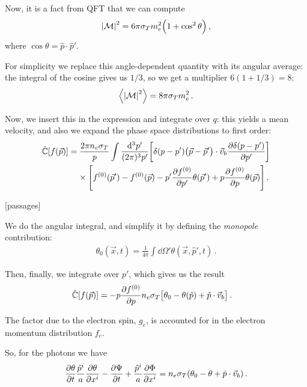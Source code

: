 \documentclass[main.tex]{subfiles}
\begin{document}
Now, it is a fact from QFT that we can compute 
%
\begin{align}
\abs{\mathcal{M}}^2 = 6 \pi \sigma_{T} m_e^2 \qty(1 + \cos^2\theta )
\,,
\end{align}
%
where \(\cos \theta = \hat{p} \cdot \hat{p}'\). 

For simplicity we replace this angle-dependent quantity with its angular average: the integral of the cosine gives us \(1/3\), so we get a multiplier \(6 ( 1+ 1/3) = 8 \): 
%
\begin{align}
\expval{ \abs{\mathcal{M}}^2} = 8 \pi \sigma_{T} m_e^2
\,.
\end{align}

Now, we insert this in the expression and integrate over \(q\): this yields a mean velocity, and also we expand the phase space distributions to first order:
%
\begin{align}
\begin{split}
\hat{\mathbb{C}} [f(\vec{p})] &= 
\frac{2 \pi n_e \sigma_{T}}{p}
\int \frac{ \dd[3]{p'}}{(2\pi)^3 p'} 
\qty[ \delta (p - p') \qty(\vec{p} - \vec{p}') \cdot \vec{v}_b \pdv{ \delta (p - p')}{p'}] \\
&\phantom{=}\ 
\times \qty[ f^{(0)} (\vec{p}') - f^{(0)}(\vec{p}) - p' \pdv{f^{(0)}}{p'} \theta (\vec{p}') + p \pdv{f^{(0)}}{p} \theta (\vec{p})]
\,.
\end{split}
\end{align}
%

[passages]

We do the angular integral, and simplify it by defining the \emph{monopole} contribution:
%
\begin{align}
\theta_0 (\vec{x}, t) =  \frac{1}{4 \pi } \int \dd{\Omega'} 
\theta (\vec{x}, \hat{p}', t)
\,.
\end{align}

Then, finally, we integrate over \(p'\), which gives us the result 
%
\begin{align}
\hat{\mathbb{C}} [f(\vec{p})] &=
- p \pdv{f^{(0)}}{p} n_e \sigma_T 
\qty[\theta_0 - \theta (\hat{p}) + \hat{p} \cdot \vec{v}_b]
\,.
\end{align}

The factor due to the electron spin, \(g_e\), is accounted for in the  electron momentum distribution \(f_e\). 

So, for the photons we have 
%
\begin{align}
\pdv{\theta }{t} \frac{\hat{p}^{i}}{a} \pdv{\theta }{x^{i}}
- \pdv{\Psi }{t} + \frac{\hat{p}^{i}}{a} \pdv{\Phi }{x^{i}} 
= n_e \sigma_{T} \qty(\theta_0 - \theta + \hat{p}\cdot \vec{v}_b )
\,.
\end{align}
\end{document}
